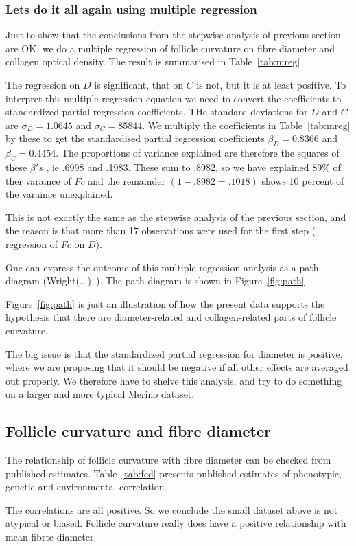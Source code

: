 \documentclass{article}
\begin{document}
\begin{tiny}
\subsubsection{ Lets do it all again using multiple regression}
Just to show that the conclusions from the stepwise analysis of previous section are OK, we do a multiple regression of follicle curvature  on fibre diameter and collagen optical density. The result is summarised in Table~\ref{tab:mreg}

The regression on $D$ is significant, that on $C$ is not, but it is at least positive. To interpret this multiple regression equation we need to convert the coefficients to standardized partial regression coefficients. THe standard deviations for $D$ and $C$ are $\sigma_{D} = 1.0645$ and $\sigma_{C} = 85844$. We multiply the coefficients in Table~\ref{tab:mreg} by these to get the standardised partial regression coefficients $\beta_{D} = 0.8366$ and $\beta_{C} = 0.4454$. The proportions of variance explained are therefore the squares of these $\beta's$ , ie .6998 and .1983. These sum to .8982, so we have explained 89\% of ther varaince of $Fc$ and the remainder $(1-.8982 = .1018)$ shows 10 percent of the varaince unexplained.

This is not exactly the same as the stepwise analysis of the previous section, and the reason is that more than 17 observations were used for the first step ( regression of $Fc$ on $D$). 

One can express the outcome of this multiple regression analysis as a path diagram (Wright(...)~\cite{wright-}). The path diagram is shown in Figure~\ref{fig:path}

Figure~\ref{fig:path} is just an illustration of how the present data supports the hypothesis that there are diameter-related and collagen-related parts of follicle curvature. 

The big issue is that the standardized partial regression for diameter is positive, where we are proposing that it should be negative if all other effects are averaged out properly.  We therefore have to shelve this analysis, and try to do something on a larger and more typical Merino dataset.

\end{tiny}

\subsection{Follicle curvature and fibre diameter}
The relationship of follicle curvature with fibre diameter can be checked from published estimates. Table~\ref{tab:fcd} presents published estimates of phenotypic, genetic and environmental correlation.

The correlations are all positive. So we conclude the small dataset above is not atypical or biased. Follicle curvature really does have a positive relationship with mean fibrte diameter.
\end{document}
